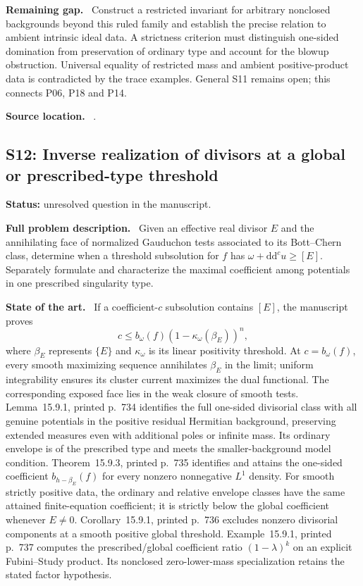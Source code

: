 \documentclass[11pt]{article}
\newcommand{\ddc}{\mathrm d\mathrm d^c}
\newcommand{\field}[1]{\par\medskip\noindent\textbf{#1.}\ }
\begin{document}
\field{Remaining gap} Construct a restricted invariant for arbitrary nonclosed backgrounds beyond this ruled family and establish the precise relation to ambient intrinsic ideal data. A strictness criterion must distinguish one-sided domination from preservation of ordinary type and account for the blowup obstruction. Universal equality of restricted mass and ambient positive-product data is contradicted by the trace examples. General S11 remains open; this connects P06, P18 and P14.
\field{Source location} .
\subsection{S12: Inverse realization of divisors at a global or prescribed-type threshold}
\label{S12}
\noindent\textbf{Status:} unresolved question in the manuscript.
\field{Full problem description} Given an effective real divisor $E$ and the annihilating face of normalized Gauduchon tests associated to its Bott--Chern class, determine when a threshold subsolution for $f$ has $\omega+\ddc u\geq[E]$. Separately formulate and characterize the maximal coefficient among potentials in one prescribed singularity type.
\field{State of the art} If a coefficient-$c$ subsolution contains $[E]$, the manuscript proves
\[c\leq b_\omega(f)(1-\kappa_\omega(\beta_E))^n,\]
where $\beta_E$ represents $\{E\}$ and $\kappa_\omega$ is its linear positivity threshold. At $c=b_\omega(f)$, every smooth maximizing sequence annihilates $\beta_E$ in the limit; uniform integrability ensures its cluster current maximizes the dual functional. The corresponding exposed face lies in the weak closure of smooth tests. Lemma~15.9.1, printed p.~734 identifies the full one-sided divisorial class with all genuine potentials in the positive residual Hermitian background, preserving extended measures even with additional poles or infinite mass. Its ordinary envelope is of the prescribed type and meets the smaller-background model condition. Theorem~15.9.3, printed p.~735 identifies and attains the one-sided coefficient $b_{h-\beta_E}(f)$ for every nonzero nonnegative $L^1$ density. For smooth strictly positive data, the ordinary and relative envelope classes have the same attained finite-equation coefficient; it is strictly below the global coefficient whenever $E\ne0$. Corollary~15.9.1, printed p.~736 excludes nonzero divisorial components at a smooth positive global threshold. Example~15.9.1, printed p.~737 computes the prescribed/global coefficient ratio $(1-\lambda)^k$ on an explicit Fubini--Study product. Its nonclosed zero-lower-mass specialization retains the stated factor hypothesis.
\end{document}
